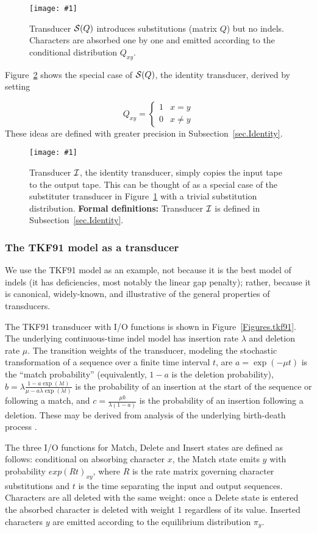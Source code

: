 \documentclass{article}
\newcommand{\secref}[1]{Subsection~\ref{sec.#1}}
\newcommand{\seclabel}[1]{\label{sec.#1}}
\newcommand{\figref}[1]{Figure~\ref{Figures.#1}}
\newcommand{\figlabel}[1]{\label{Figures.#1}}
\newcommand{\easyfig}[4]{
\begin{figure}
\texttt{[image: \#1]}
\caption{ \figlabel{#3} #4}
\end{figure}}
\newcommand{\pdffig}[2]{\easyfig{#1-fig.pdf}{}{#1}{#2}}
\newcommand\substitute{{\cal S}}
\newcommand\formaldefs{{\bf Formal definitions: }}
\newcommand\identity{{\cal I}}
\begin{document}
\pdffig{substituter}{Transducer $\substitute(Q)$ introduces substitutions (matrix $Q$) but no indels.  
Characters are absorbed one by one and emitted according to the conditional distribution $Q_{xy}$.}

\figref{identity} shows the special case of $\substitute(Q)$, the identity transducer,
derived by setting

\[
Q_{xy} = \left\{
\begin{array}{ll}
1 & x=y \\
0 & x \neq y
\end{array}
\right.
\]
These ideas are defined with greater precision in \secref{Identity}. 

\pdffig{identity}{Transducer $\identity$, the identity transducer, 
simply copies the input tape to the output tape.  This can be thought of as a special case of the substituter transducer in \figref{substituter} with a trivial substitution distribution. 
\formaldefs
Transducer $\identity$ is defined in \secref{Identity}.
}


\subsubsection{The TKF91 model as a transducer}
\seclabel{tkf91}

We use the TKF91 model as an example, not because it is the best model of indels
 (it has deficiencies, most notably the linear gap penalty);
rather, because it is canonical, widely-known, and illustrative of the general properties of transducers.  

The TKF91 transducer with I/O functions is shown in \figref{tkf91}.  
The underlying continuous-time indel model has insertion rate $\lambda$ and deletion rate $\mu$.
The transition weights of the transducer,
modeling the stochastic transformation of a sequence over a finite time interval $t$,
are
$a = \exp(-\mu t)$ is the ``match probability'' (equivalently, $1-a$ is the deletion probability),
$b = \lambda\frac{1 - a \exp(\lambda t)}{\mu - a \lambda \exp(\lambda t)}$ is the probability of an insertion at the start of the sequence or following a match,
and $c = \frac{\mu b}{\lambda(1-a)}$ is the probability of an insertion following a deletion. 
These may be derived from analysis of the underlying birth-death process \cite{ThorneEtal91}.

The three I/O functions for Match, Delete and Insert states are defined as follows:
conditional on absorbing character $x$, the Match state emits  $y$ with probability
$exp(Rt)_{xy}$, where $R$ is the rate matrix governing character substitutions and 
$t$ is the time separating the input and output sequences. 
Characters are all deleted with the same weight: once a Delete state is entered the 
absorbed character is deleted with weight 1 regardless of its value.  
Inserted characters $y$ are emitted according to the equilibrium distribution $\pi_y$.
\end{document}
